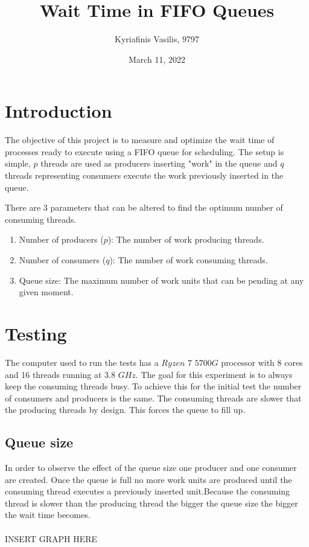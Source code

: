 \documentclass[a4paper, 12pt]{report}
\title{\Large{\textbf{Wait Time in FIFO Queues}}}
\author{Kyriafinis Vasilis, 9797}
\date{March 11, 2022}
\begin{document}
    \maketitle
    
    \section*{Introduction}

    The objective of this project is to measure and optimize the wait time of processes ready to execute
    using a FIFO queue for scheduling. The setup is simple, \(p\) threads are used as producers inserting 
    "work" in the queue and \(q\) threads representing consumers execute the work previously inserted in the 
    queue.

    There are 3 parameters that can be altered to find the optimum number of consuming threads.

    \begin{enumerate}
        \item Number of producers (\(p\)): The number of work producing threads.
        \item Number of consumers (\(q\)): The number of work consuming threads.
        \item Queue size: The maximum number of work units that can be pending at any given moment.
    \end{enumerate}


    \section*{Testing}

    The computer used to run the tests has a \(Ryzen\) \(7\) \(5700G\) processor with 8 cores and 16 threads 
    running at \(3.8\) \(GHz\). The goal for this experiment is to always keep the consuming threads busy. To achieve
    this for the initial test the number of consumers and producers is the same. The consuming threads
    are slower that the producing threads by design. This forces the queue to fill up.

    \subsection*{Queue size}

    In order to observe the effect of the queue size one producer and one consumer are created. Once the queue is
    full no more work units are produced until the consuming thread executes a previously inserted unit.Because the
    consuming thread is slower than the producing thread the bigger the queue size the bigger the wait time becomes.
    \\
    \\
    \noindent INSERT GRAPH HERE
\end{document}
